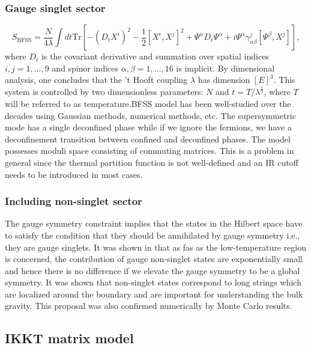 \documentclass[11pt]{article}
\begin{document}
\subsubsection{Gauge singlet sector}

\begin{equation}
	S_{\text{BFSS}}=\frac{N}{4\lambda} \int dt \mbox{Tr} \left[
	-(D_t X^i)^2 - \frac{1}{2} \left[X^i,X^j\right]^2 +  \Psi^\alpha D_t \Psi^\alpha + i \Psi^\alpha \gamma_{\alpha \beta}^j [\Psi^\beta,X^j]
	\right],
	\label{D0action}
\end{equation}
where $D_t$ is the covariant derivative and summation over spatial indices 
$i,j=1,\dots,9$ and  spinor indices $\alpha,\beta=1,\dots,16$ is implicit. By dimensional analysis, one concludes that the 't Hooft coupling $\lambda$ has dimension $[E]^3$. This system is controlled by two dimensionless parameters: $N$ and $ t=T/\lambda^{\frac{1}{3}}$, where $T$ will be referred to as temperature.BFSS model has been well-studied over the decades using Gaussian methods, numerical methods, etc. The supersymmetric mode has a single deconfined phase while if we ignore the fermions, we have a deconfinement transition between confined and deconfined phases. The model possesses moduli space consisting of commuting matrices. This is a problem in general since the thermal partition function is not well-defined and an IR cutoff needs to be introduced in most cases. 





\subsubsection{Including non-singlet sector}


The gauge symmetry constraint implies that the states in the Hilbert space have to satisfy the condition that they should be annihilated by gauge symmetry i.e., they are gauge singlets. It was shown in that as fas as the low-temperature region is concerned, the contribution of gauge non-singlet states are exponentially small and hence there is no difference if we elevate the gauge symmetry to be a global symmetry. It was shown that non-singlet states correspond to long strings which are localized around the boundary and are important for understanding the bulk gravity. This proposal was also confirmed numerically by Monte Carlo results. 


 


\subsection{IKKT matrix model}
\end{document}
